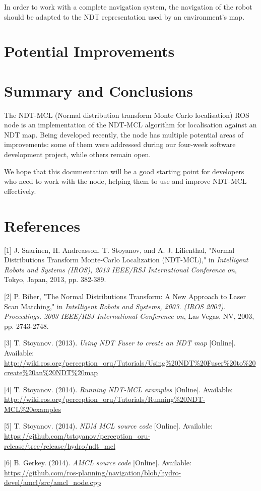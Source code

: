 \documentclass[12pt]{article}
\begin{document}
	In order to work with a complete navigation system, the navigation of the robot should be adapted to the NDT representation used by an environment's map.

	\section{Potential Improvements}
	\label{sec:potentialImprovements}

	\section{Summary and Conclusions}
	\label{sec:summaryAndConclusions}

	The NDT-MCL (Normal distribution transform Monte Carlo localisation) ROS node is an implementation of the NDT-MCL algorithm for localisation against an NDT map. Being developed recently, the node has multiple potential areas of improvements: some of them were addressed during our four-week software development project, while others remain open.

	We hope that this documentation will be a good starting point for developers who need to work with the node, helping them to use and improve NDT-MCL effectively.

	\section{References}
	\label{sec:references}

	[1] J. Saarinen, H. Andreasson, T. Stoyanov, and A. J. Lilienthal, "Normal Distributions Transform Monte-Carlo Localization (NDT-MCL)," in {\it Intelligent Robots and Systems (IROS), 2013 IEEE/RSJ International Conference on}, Tokyo, Japan, 2013, pp. 382-389.

	\setlength{\parskip}{0.25in}

	[2] P. Biber, "The Normal Distributions Transform: A New Approach to Laser Scan Matching," in {\it Intelligent Robots and Systems, 2003. (IROS 2003). Proceedings. 2003 IEEE/RSJ International Conference on}, Las Vegas, NV, 2003, pp. 2743-2748.

	[3] T. Stoyanov. (2013). {\it Using NDT Fuser to create an NDT map} [Online]. Available: \url{http://wiki.ros.org/perception_oru/Tutorials/Using%20NDT%20Fuser%20to%20create%20an%20NDT%20map}

	[4] T. Stoyanov. (2014). {\it Running NDT-MCL examples} [Online]. Available: \url{http://wiki.ros.org/perception_oru/Tutorials/Running%20NDT-MCL%20examples}

	[5] T. Stoyanov. (2014). {\it NDM MCL source code} [Online]. Available: \url{https://github.com/tstoyanov/perception_oru-release/tree/release/hydro/ndt_mcl}

	[6] B. Gerkey. (2014). {\it AMCL source code} [Online]. Available: \url{https://github.com/ros-planning/navigation/blob/hydro-devel/amcl/src/amcl_node.cpp}
\end{document}
